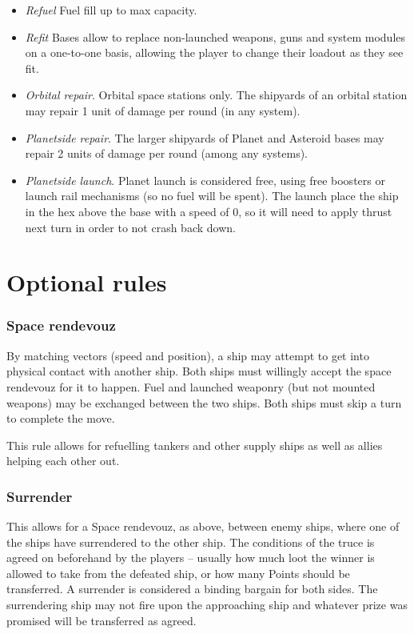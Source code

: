 \documentclass[a4paper,12pt,notitlepage,twocolumn]{article}
\begin{document}
\begin{itemize}
\item \emph{Refuel} Fuel fill up to max capacity. 
\item \emph{Refit} Bases allow to replace non-launched weapons, guns and system modules 
on a one-to-one basis, allowing the player to change their loadout as they see fit. 
\item \emph{Orbital repair}. Orbital space stations only. The shipyards of an orbital station
    may repair 1 unit of damage per round (in any system). 
\item \emph{Planetside repair}. The larger shipyards of Planet and Asteroid bases may repair
    2 units of damage per round (among any systems). 
\item \emph{Planetside launch}. Planet launch is considered free, using free boosters or
launch rail mechanisms (so no fuel will be spent). The launch place the ship in the hex
above the base with a speed of 0, so it will need to apply thrust next turn in order to not
crash back down. 
\end{itemize}


\section{Optional rules}
\label{sec:optional_rules}


\subsubsection*{Space rendevouz}

By matching vectors (speed and position), a ship may attempt to get
into physical contact with another ship.  Both ships must willingly
accept the space rendevouz for it to happen. Fuel and launched
weaponry (but not mounted weapons) may be exchanged between the two
ships. Both ships must skip a turn to
complete the move. 

This rule allows for refuelling tankers and other supply ships as well
as allies helping each other out. 

\subsubsection*{Surrender}

This allows for a Space rendevouz, as above, between enemy ships,
where one of the ships have surrendered to the other ship. The
conditions of the truce is agreed on beforehand by the players --
usually how much loot the winner is allowed to take from the defeated
ship, or how many Points should be transferred. A surrender is
considered a binding bargain for both sides. The surrendering ship may not fire
upon the approaching ship and whatever prize was promised will be
transferred as agreed. 
\end{document}
